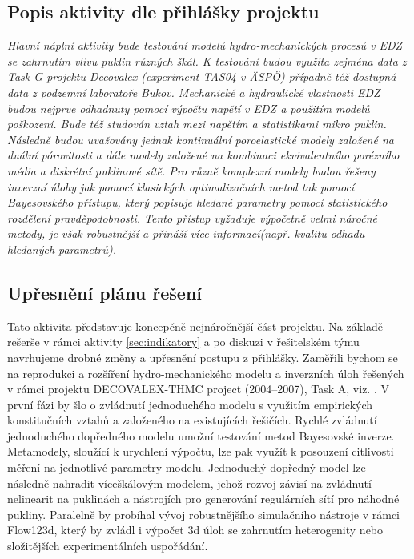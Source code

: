 \documentclass[11pt,a4paper]{article}
\begin{document}
\begin{onehalfspacing}
\subsection{Popis aktivity dle přihlášky projektu}
{\it 
Hlavní náplní aktivity bude testování modelů hydro-mechanických procesů v EDZ se zahrnutím vlivu puklin různých škál. K testování budou využita zejména data z Task G projektu Decovalex (experiment TAS04 v \"ASP\"O) případně též dostupná data z podzemní
laboratoře Bukov. Mechanické a hydraulické vlastnosti EDZ budou nejprve odhadnuty pomocí výpočtu napětí v EDZ a použitím modelů poškození. Bude též studován vztah mezi napětím a statistikami mikro puklin. Následně budou uvažovány jednak kontinuální poroelastické modely založené na duální pórovitosti a dále modely založené na kombinaci ekvivalentního porézního média a diskrétní puklinové sítě. Pro různě komplexní modely budou řešeny inverzní úlohy jak pomocí klasických optimalizačních metod tak pomocí
Bayesovského přístupu, který popisuje hledané parametry pomocí statistického rozdělení pravděpodobnosti. Tento přístup vyžaduje výpočetně velmi náročné metody, je však robustnější a přináší více informací(např. kvalitu odhadu hledaných parametrů).}

\subsection{Upřesnění plánu řešení}
Tato aktivita představuje koncepčně nejnáročnější část projektu. Na základě rešerše v rámci aktivity \ref{sec:indikatory} 
a po diskuzi v řešitelském týmu navrhujeme drobné změny a upřesnění postupu z přihlášky. Zaměřili bychom se na reprodukci a rozšíření 
hydro-mechanického modelu a inverzních úloh řešených v rámci projektu DECOVALEX-THMC project (2004–2007), Task A, viz. \cite{Rutqvist2009}. 
V první fázi by šlo o zvládnutí jednoduchého modelu s využitím empirických konstitučních vztahů a založeného na existujících řešičích. 
Rychlé zvládnutí jednoduchého dopředného modelu umožní testování metod Bayesovské inverze. Metamodely, sloužící k urychlení 
výpočtu, lze pak využít k posouzení citlivosti měření na jednotlivé parametry modelu. Jednoduchý dopředný model lze následně nahradit 
víceškálovým modelem, jehož rozvoj závisí na zvládnutí nelinearit na puklinách a nástrojích pro generování regulárních sítí pro náhodné pukliny.  
Paralelně by probíhal vývoj robustnějšího simulačního nástroje v rámci Flow123d,
který by zvládl i výpočet 3d úloh se zahrnutím heterogenity nebo složitějších experimentálních uspořádání.


\end{onehalfspacing}
\end{document}
